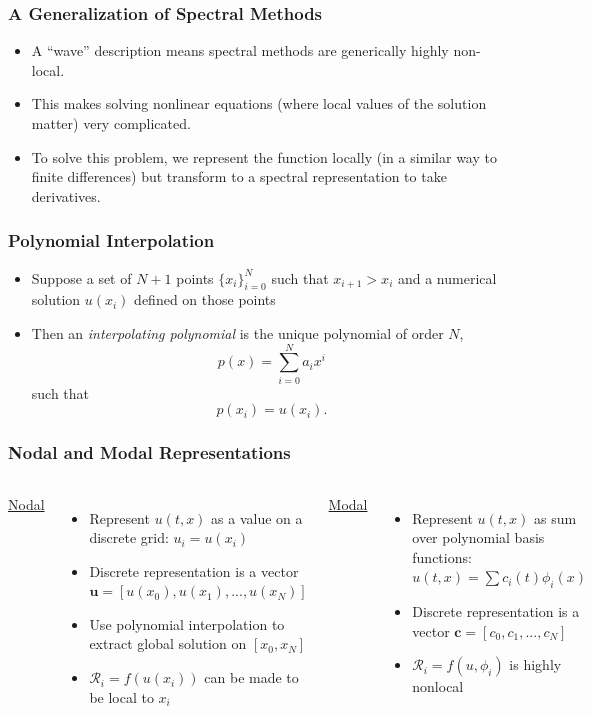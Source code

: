 \documentclass[]{beamer}
\newcommand{\myvec}[1]{\mathbf{#1}} %
\begin{document}
\begin{frame}
  \frametitle{A Generalization of Spectral Methods}
  \pause
  \begin{itemize}
    \item A ``wave'' description means spectral methods are generically highly non-local.
    \item This makes solving nonlinear equations (where local values
      of the solution matter) very complicated.
      \pause
    \item To solve this problem, we represent the function locally (in
      a similar way to finite differences) but transform to a spectral
      representation to take derivatives.
  \end{itemize}
\end{frame}

\begin{frame}
  \frametitle{Polynomial Interpolation}
  \begin{itemize}
  \item Suppose a set of $N+1$ points $\{x_i\}_{i=0}^N$ such that
    $x_{i+1}>x_i$ and a numerical solution $u(x_i)$ defined on those
    points
    \pause
  \item Then an \textit{interpolating polynomial} is the unique polynomial of order $N$,
    $$p(x) = \sum_{i=0}^N a_i x^i$$
    such that
    $$p(x_i) = u(x_i).$$
  \end{itemize}
\end{frame}

\begin{frame}
  \frametitle{Nodal and Modal Representations}
  \begin{columns}
    \column{6cm}
    \begin{center}{\Large\underline{Nodal}}\end{center}
    \begin{itemize}
    \item Represent $u(t,x)$ as a value on a discrete grid: $u_i=u(x_i)$
    \item Discrete representation is a vector $\myvec{u}=[u(x_0),u(x_1),...,u(x_N)]$
    \item Use polynomial interpolation to extract global solution on $[x_0,x_N]$
    \item $\mathcal{R}_i=f(u(x_i))$ can be made to be local to $x_i$
    \end{itemize}
    \column{6cm}
    \begin{center}{\Large\underline{Modal}}\end{center}
    \begin{itemize}
    \item Represent $u(t,x)$ as sum over polynomial basis functions: $u(t,x)=\sum c_i(t) \phi_i(x)$
    \item Discrete representation is a vector $\myvec{c}=[c_0,c_1,...,c_N]$
    \item $\mathcal{R}_i=f(u,\phi_i)$ is highly nonlocal
    \end{itemize}
  \end{columns}
\end{frame}
\end{document}
